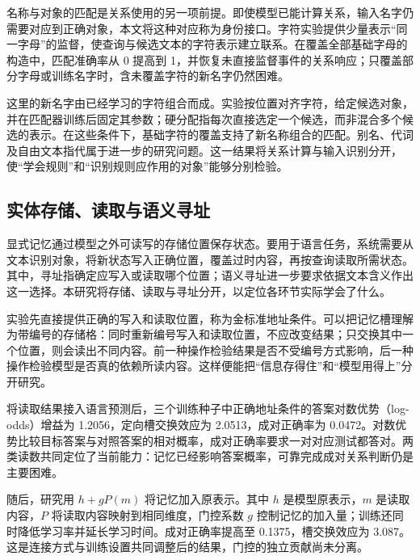 名称与对象的匹配是关系使用的另一项前提。即使模型已能计算关系，输入名字仍需要对应到正确对象，本文将这种对应称为身份接口。字符实验提供少量表示“同一字母”的监督，使查询与候选文本的字符表示建立联系。在覆盖全部基础字母的构造中，匹配准确率从 0 提高到 1，并恢复未直接监督事件的关系响应；只覆盖部分字母或训练名字时，含未覆盖字符的新名字仍然困难。

这里的新名字由已经学习的字符组合而成。实验按位置对齐字符，给定候选对象，并在匹配器训练后固定其参数；硬分配指每次直接选定一个候选，而非混合多个候选的表示。在这些条件下，基础字符的覆盖支持了新名称组合的匹配。别名、代词及自由文本指代属于进一步的研究问题。这一结果将关系计算与输入识别分开，使“学会规则”和“识别规则应作用的对象”能够分别检验。

\subsection{实体存储、读取与语义寻址}
\label{sec:memory_branch}

显式记忆通过模型之外可读写的存储位置保存状态。要用于语言任务，系统需要从文本识别对象，将新状态写入正确位置，覆盖过时内容，再按查询读取所需状态。其中，寻址指确定应写入或读取哪个位置；语义寻址进一步要求依据文本含义作出这一选择。本研究将存储、读取与寻址分开，以定位各环节实际学会了什么。

实验先直接提供正确的写入和读取位置，称为金标准地址条件。可以把记忆槽理解为带编号的存储格：同时重新编号写入和读取位置，不应改变结果；只交换其中一个位置，则会读出不同内容。前一种操作检验结果是否不受编号方式影响，后一种操作检验模型是否真的依赖所读内容。这样便能把“信息存得住”和“模型用得上”分开研究。

将读取结果接入语言预测后，三个训练种子中正确地址条件的答案对数优势（log-odds）增益为 1.2056，定向槽交换效应为 2.0513，成对正确率为 0.0472。对数优势比较目标答案与对照答案的相对概率，成对正确率要求一对对应测试都答对。两类读数共同定位了当前能力：记忆已经影响答案概率，可靠完成成对关系判断仍是主要困难。

随后，研究用 $h+gP(m)$ 将记忆加入原表示。其中 $h$ 是模型原表示，$m$ 是读取内容，$P$ 将读取内容映射到相同维度，门控系数 $g$ 控制记忆的加入量；训练还同时降低学习率并延长学习时间。成对正确率提高至 0.1375，槽交换效应为 3.087。这是连接方式与训练设置共同调整后的结果，门控的独立贡献尚未分离。


